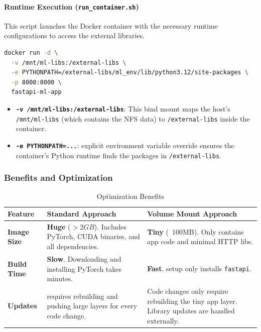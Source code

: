 \documentclass[10pt,a4paper,twocolumn]{article}
\begin{document}
\paragraph{Runtime Execution (\texttt{run\_container.sh})}
This script launches the Docker container with the necessary runtime configurations to access the external libraries.

\begin{lstlisting}[language=Bash, caption={Container Execution Command}]
docker run -d \
  -v /mnt/ml-libs:/external-libs \
  -e PYTHONPATH=/external-libs/ml_env/lib/python3.12/site-packages \
  -p 8000:8000 \
  fastapi-ml-app
\end{lstlisting}

\begin{itemize}
    \item \textbf{\texttt{-v /mnt/ml-libs:/external-libs}}: This bind mount maps the host's \texttt{/mnt/ml-libs} (which contains the NFS data) to \texttt{/external-libs} inside the container.
    \item \textbf{\texttt{-e PYTHONPATH=...}}: explicit environment variable override ensures the container's Python runtime finds the packages in \texttt{/external-libs}.
\end{itemize}

\subsubsection{Benefits and Optimization}

\begin{table}[t!]
\centering
\caption{Optimization Benefits} 
\label{tab:docker_optimization}
\begin{tabular}{|l|p{6cm}|p{6cm}|}
\hline
\textbf{Feature} & \textbf{Standard Approach} & \textbf{Volume Mount Approach} \\ \hline
\textbf{Image Size} & \textbf{Huge} ($>2GB$). Includes PyTorch, CUDA binaries, and all dependencies. & \textbf{Tiny} (~100MB). Only contains app code and minimal HTTP libs. \\ \hline
\textbf{Build Time} & \textbf{Slow}. Downloading and installing PyTorch takes minutes. & \textbf{Fast}. setup only installs \texttt{fastapi}. \\ \hline
\textbf{Updates} & requires rebuilding and pushing large layers for every code change. & Code changes only require rebuilding the tiny app layer. Library updates are handled externally. \\ \hline
\end{tabular}
\end{table}
\end{document}
